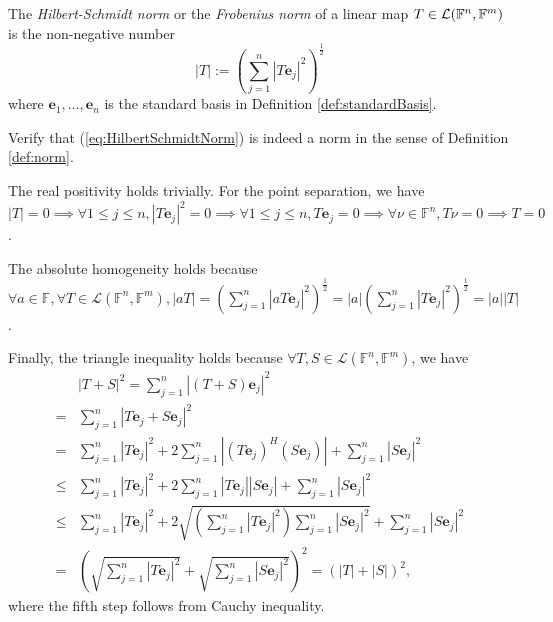 \begin{defn}
  \label{def:HilbertSchmidtNorm}
  The \emph{Hilbert-Schmidt norm} or the \emph{Frobenius norm}
  of a linear map
  \mbox{$T\in {\cal L}(\mathbb{F}^n,\mathbb{F}^m)$}
  is the non-negative number 
  \begin{equation}
    \label{eq:HilbertSchmidtNorm}
    |T| := \left(
      \sum_{j=1}^n \left|T \mathbf{e}_j\right|^2
    \right)^{\frac{1}{2}}
  \end{equation}
  where $\mathbf{e}_1, \ldots, \mathbf{e}_n$
  is the standard basis %
  in Definition \ref{def:standardBasis}.
\end{defn}

\begin{exc}
  Verify that (\ref{eq:HilbertSchmidtNorm})
  is indeed a norm in the sense of Definition \ref{def:norm}.
\end{exc}
\begin{solution}
  The real positivity holds trivially.
  For the point separation, we have
  $|T| = 0 \implies \forall 1 \leq j \leq n,|T\mathbf{e}_j|^2 = 0
  \implies \forall 1 \leq j \leq n, T\mathbf{e}_j = 0 \implies \forall
  \nu \in \mathbb{F}^n, T\nu = 0 \implies T = 0$.

  The absolute homogeneity holds because
  $\forall a \in \mathbb{F}, \forall T \in \mathcal{L}(\mathbb{F}^n,
  \mathbb{F}^m), |aT| = (\sum\limits_{j =
    1}^n|aT\mathbf{e}_j|^2)^{\frac{1}{2}} = |a|(\sum\limits_{j =
    1}^n|T\mathbf{e}_j|^2)^{\frac{1}{2}} = |a||T|$.

  Finally, the triangle inequality holds because
  $\forall T, S \in \mathcal{L}(\mathbb{F}^n, \mathbb{F}^m)$, we have
    \begin{align*}
      &|T + S|^2 = \sum\limits_{j = 1}^n|(T+S)\mathbf{e}_j|^2
      \\ =& \sum\limits_{j = 1}^n|T\mathbf{e}_j + S\mathbf{e}_j|^2
      \\
      =& \sum\limits_{j = 1}^n|T\mathbf{e}_j|^2
         + 2\sum\limits_{j = 1}^n|(T\mathbf{e}_j)^H(S\mathbf{e}_j)|
         + \sum\limits_{j = 1}^n|S\mathbf{e}_j|^2
      \\
      \le& \sum\limits_{j = 1}^n|T\mathbf{e}_j|^2
           + 2\sum\limits_{j = 1}^n|T\mathbf{e}_j||S\mathbf{e}_j|
           + \sum\limits_{j = 1}^n|S\mathbf{e}_j|^2
      \\
      \le& \sum\limits_{j = 1}^n|T\mathbf{e}_j|^2 %
           + 2\sqrt{\left(\sum\limits_{j = 1}^n|T\mathbf{e}_j|^2\right)
           \sum\limits_{j = 1}^n|S\mathbf{e}_j|^2}
           + \sum\limits_{j = 1}^n|S\mathbf{e}_j|^2
      \\
      =& \left(\sqrt{\sum\limits_{j = 1}^n|T\mathbf{e}_j|^2} +
         \sqrt{\sum\limits_{j = 1}^n|S\mathbf{e}_j|^2}\right)^2 = (|T|
         + |S|)^2, 
    \end{align*}
  where the fifth step follows from Cauchy inequality.  
\end{solution}

